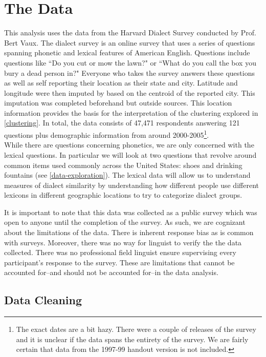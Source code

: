 \documentclass[10pt,letterpaper]{article}
\begin{document}
\section{The Data}\label{data}



This analysis uses the data from the Harvard Dialect Survey conducted by Prof. Bert Vaux. The dialect survey is an online survey that uses a series of questions spanning phonetic and lexical features of American English. Questions include questions like ``Do you cut or mow the lawn?" or ``What do you call the box you bury a dead person in?" Everyone who takes the survey answers these questions as well as self reporting their location as their state and city. Latitude and longitude were then imputed by based on the centroid of the reported city. This imputation was completed beforehand but outside sources. This location information provides the basis for the interpretation of the clustering explored in \ref{clustering}. In total, the data consists of 47,471 respondents answering 121 questions plus demographic information from around 2000-2005\footnote{The exact dates are a bit hazy. There were a couple of releases of the survey and it is unclear if the data spans the entirety of the survey. We are fairly certain that data from the 1997-99 handout version is not included.}.\\ 

While there are questions concerning phonetics, we are only concerned with the lexical questions. In particular we will look at two questions that revolve around common items used commonly across the United States: shoes and drinking fountains (see \ref{data-exploration}). The lexical data will allow us to understand measures of dialect similarity by understanding how different people use different lexicons in different geographic locations to try to categorize dialect groups. 


It is important to note that this data was collected as a public survey which was open to anyone until the completion of the survey. As such, we are cognizant about the limitations of the data. There is inherent response bias as is common with surveys. Moreover, there was no way for linguist to verify the the data collected. There was no professional field linguist ensure supervising every participant's response to the survey. These are limitations that cannot be accounted for--and should not be accounted for--in the data analysis.

\subsection{Data Cleaning}\label{data-cleaning}
\end{document}
